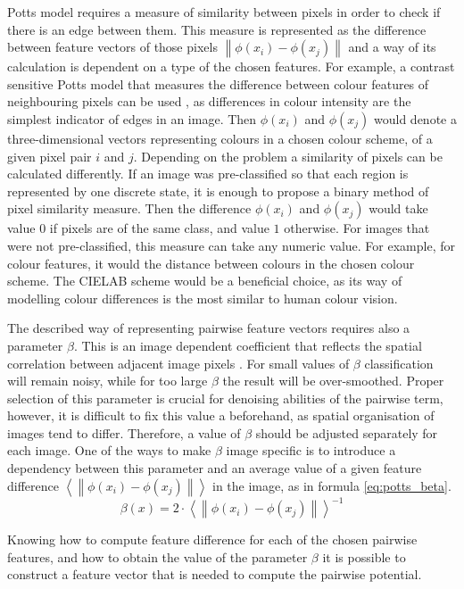 Potts model requires a measure of similarity between pixels in order to check if there is an edge between them. This measure is represented as the difference between feature vectors of those pixels $\left \| \phi(x_i) - \phi(x_j)\right \|$ and a way of its calculation is dependent on a type of the chosen features. For example, a contrast sensitive Potts model that measures the difference between colour features of neighbouring pixels can be used \cite{article_main}, as differences in colour intensity are the simplest indicator of edges in an image. Then $\phi(x_i)$ and $\phi(x_j)$ would denote a three-dimensional vectors representing colours in a chosen colour scheme, of a given pixel pair $i$ and $j$. Depending on the problem a similarity of pixels can be calculated differently. If an image was pre-classified so that each region is represented by one discrete state, it is enough to propose a binary method of pixel similarity measure. Then the difference $\phi(x_i)$ and $\phi(x_j)$ would take value $0$ if pixels are of the same class, and value $1$ otherwise. For images that were not pre-classified, this measure can take any numeric value. For example, for colour features, it would the distance between colours in the chosen colour scheme. The CIELAB scheme would be a beneficial choice, as its way of modelling colour differences is the most similar to human colour vision. 

The described way of representing pairwise feature vectors requires also a parameter $\beta$. This is an image dependent coefficient that reflects the spatial correlation between adjacent image pixels \cite{potts_beta}. For small values of $\beta$ classification will remain noisy, while for too large $\beta$ the result will be over-smoothed. Proper selection of this parameter is crucial for denoising abilities of the pairwise term, however, it is difficult to fix this value a beforehand, as spatial organisation of images tend to differ. Therefore, a value of $\beta$ should be adjusted separately for each image. One of the ways to make $\beta$ image specific is to introduce a dependency between this parameter and an average value of a given feature difference $\left \langle \left \| \phi(x_i) - \phi(x_j)\right \| \right \rangle$ in the image, as in formula \ref{eq:potts_beta}.
\begin{equation}
    \label{eq:potts_beta}
    \beta(x) = {2 \cdot {\left \langle \left \| \phi(x_i) - \phi(x_j)\right \| \right \rangle}} ^ {-1}
\end{equation}

Knowing how to compute feature difference for each of the chosen pairwise features, and how to obtain the value of the parameter $\beta$ it is possible to construct a feature vector that is needed to compute the pairwise potential. 